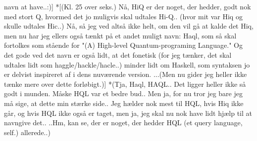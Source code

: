 \documentclass{report}
\begin{document}
navn at have..:)] *[(Kl. 25 over seks.) Nå, HiQ er der noget, der hedder, godt nok med stort Q, hvormed det jo muligvis skal udtales Hi-Q.. (hvor mit var Hiq og skulle udtales Hic..) Nå, så jeg ved altså ikke helt, om den vil gå at kalde det Hiq, men nu har jeg ellers også tænkt på et andet muligt navn: Haql, som så skal fortolkes som stående for "(A) High-level Quantum-programing Language." Og det gode ved det navn er også lidt, at det fonetisk (for jeg tænker, det skal udtales lidt som haggle/hackle/hacle..) minder lidt om Haskell, som syntaksen jo er delvist inspireret af i dens nuværende version. ...(Men nu gider jeg heller ikke tænke mere over dette forløbigt.)] *(Tja, Haql, HAQL.. Det ligger heller ikke så godt i munden. Måske HQL var et bedre bud.. Men ja, for nu tror jeg bare jeg må sige, at dette min stærke side.. Jeg hælder nok mest til HQL, hvis Hiq ikke går, og hvis HQL ikke også er taget, men ja, jeg skal nu nok have lidt hjælp til at navngive det.. ..Hm, kan se, der er noget, der hedder HQL (et query language, self.) allerede..)
\end{document}
